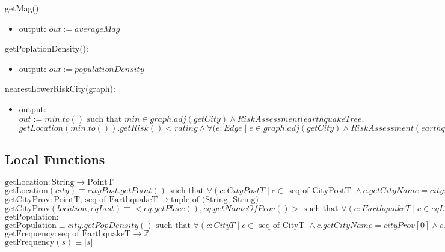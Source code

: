 \documentclass[12pt]{article}
\begin{document}
\noindent getMag():
\begin{itemize}
\item output: $\mathit{out} := averageMag$ 
\end{itemize}

\noindent getPoplationDensity():
\begin{itemize}
\item output: $\mathit{out} := populationDensity$ 
\end{itemize}

\noindent nearestLowerRiskCity(graph):
\begin{itemize}
\item output: $\mathit{out} := min.to() \mbox{ such that } min \in graph.adj(getCity) \land RiskAssessment(earthquakeTree,$\\ $getLocation(min.to()).getRisk() < rating \land  \forall (e : Edge \;|\; e \in graph.adj(getCity) \land 
RiskAssessment(earthquakeTree, getLocation(e.to()).getRisk() < rating : e.weight \ge min.weight)$ 
\end{itemize}

\newpage

\subsection*{Local Functions}
\noindent $\text{getLocation}: \text{String} \rightarrow \text{PointT}$\\
\noindent $\text{getLocation}(city) \equiv cityPost.getPoint() \mbox{ such that } \forall (c: CityPostT \;|\; c \in \mbox{ seq of CityPostT } \land c.getCityName = city: cityPost = c ) $\\

\noindent $\text{getCityProv}: \text{PointT, seq of EarthquakeT} \rightarrow \text{tuple of (String, String)}$\\
\noindent $\text{getCityProv}(location, eqList) \equiv <eq.getPlace(), eq.getNameOfProv()> \mbox{ such that } \forall (e: EarthquakeT \;|\; c \in eqList: location.distanceTo(e.getPointT()) \ge location.distanceTo(eq.getPointT()))$\\

\noindent $\text{getPopulation}: $\\
\noindent $\text{getPopulation} \equiv city.getPopDensity() \mbox{ such that } \forall (c: CityT \;|\; c \in \mbox{ seq of CityT } \land c.getCityName = cityProv[0] \land c.getProvince = cityProv[1]: city = c ) $\\

\noindent $\text{getFrequency}: \text{seq of EarthquakeT} \rightarrow \mathbb{Z}$\\
\noindent $\text{getFrequency}(s) \equiv |s| $\\
\end{document}
